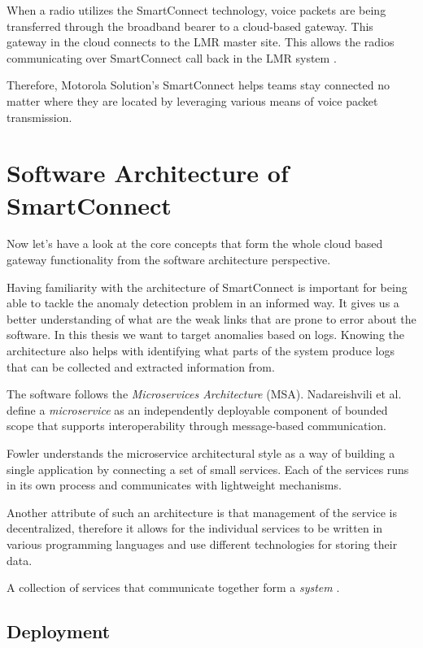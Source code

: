 When a radio utilizes the SmartConnect technology, voice packets are being transferred through the broadband bearer to a cloud-based gateway. This gateway in the cloud connects to the LMR master site. This allows the radios communicating over SmartConnect call back in the LMR system \cite{apxnextslides}.

Therefore, Motorola Solution's SmartConnect helps teams stay connected no matter where they are located by leveraging various means of voice packet transmission.

\section{Software Architecture of SmartConnect}
\label{smart-connect:architecture}

Now let's have a look at the core concepts that form the whole cloud based gateway functionality from the software architecture perspective. 

Having familiarity with the architecture of SmartConnect is important for being able to tackle the anomaly detection problem in an informed way. It gives us a better understanding of what are the weak links that are prone to error about the software.
In this thesis we want to target anomalies based on logs. Knowing the architecture also helps with identifying what parts of the system produce logs that can be collected and extracted information from.

The software follows the \textit{Microservices Architecture} (MSA).
Nadareishvili et al. \cite{nadareishvili2016microservice} define a \textit{microservice} as an independently deployable component of bounded scope that supports interoperability through message-based communication. 

Fowler \cite{fowler2014microservices} understands the microservice architectural style as a way of building a single application by connecting a set of small services. Each of the services runs in its own process and communicates with lightweight mechanisms.

Another attribute of such an architecture is that management of the service is decentralized, therefore it allows for the individual services to be written in various programming languages and use different technologies for storing their data.

A collection of services that communicate together form a \textit{system} \cite{indrasiri2018microservices}.

\subsection{Deployment}

